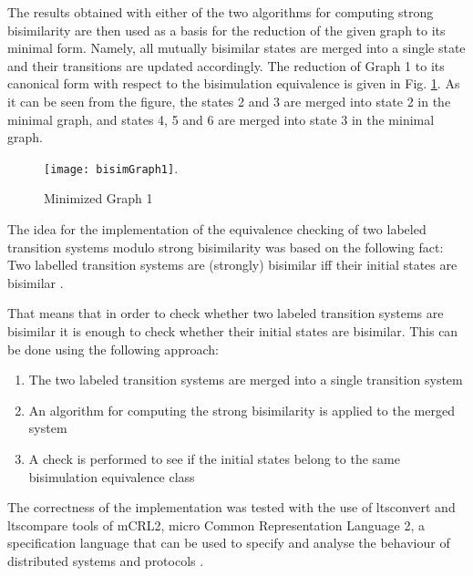 The results obtained with either of the two algorithms for computing strong bisimilarity are then used as a basis for the reduction of the given graph to its minimal form. Namely, all mutually bisimilar states are merged into a single state and their transitions are updated accordingly. The reduction of Graph 1 to its canonical form with respect to the bisimulation equivalence is given in Fig.  \ref{fig:bisimGraph1}. As it can be seen from the figure, the states 2 and 3 are merged into state 2 in the minimal graph, and states 4, 5 and 6 are merged into state 3 in the minimal graph.

\begin{figure}[h!]
\centering
\texttt{[image: bisimGraph1]}.
\caption{Minimized Graph 1}
\label{fig:bisimGraph1}
\end{figure}

The idea for the implementation of the equivalence checking of two labeled transition systems modulo strong bisimilarity was based on the following fact: Two labelled transition systems are (strongly) bisimilar iff their initial states are bisimilar \cite{ModellingAndAnalysis}.

That means that in order to check whether two labeled transition systems are bisimilar it is enough to check whether their initial states are bisimilar. This can be done using the following approach:
\begin{enumerate}
	\item The two labeled transition systems are merged into a single transition system
	\item An algorithm for computing the strong bisimilarity is applied to the merged system
	\item A check is performed to see if the initial states belong to the same bisimulation equivalence class
\end{enumerate}

The correctness of the implementation was tested with the use of ltsconvert and ltscompare tools of mCRL2, micro Common Representation Language 2, a specification language that can be used to specify and analyse the behaviour of distributed systems and protocols
\cite{mCRL2Ref}.
